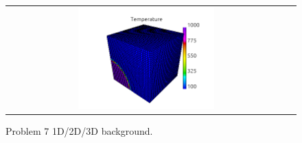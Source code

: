 \documentclass[review]{elsarticle}
\begin{document}
\begin{figure}[tbh]
\begin{center}
\begin{tabular}{cc}
      \includegraphics[width=0.5\textwidth]{figs/temperature_p73D.png} 
    \end{tabular}
  \caption{
    Problem 7 1D/2D/3D background.
  }
  \end{center}
  \label{fig:p71D_rho_T}
\end{figure}

\renewcommand{\psize}{0.33}
\end{document}
